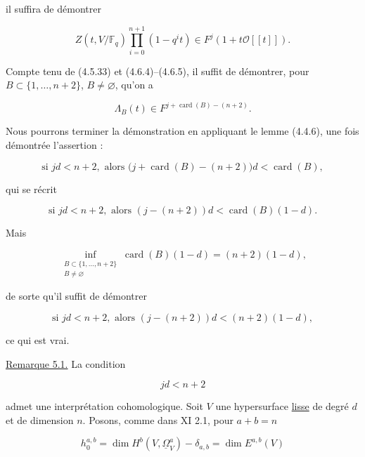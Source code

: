 il suffira de démontrer

\begin{equation}\tag{5.0.11}
Z(t,V/\mathbb F_q)\prod_{i=0}^{n+1}(1-q^it)
\in F^j(1+t\mathcal O[[t]]).
\end{equation}

Compte tenu de (4.5.33) et (4.6.4)--(4.6.5), il suffit de démontrer, pour
$B\subset\{1,\ldots,n+2\}$, $B\ne\varnothing$, qu'on a

\begin{equation}\tag{5.0.12}
\Lambda_B(t)\in F^{j+\operatorname{card}(B)-(n+2)}.
\end{equation}

Nous pourrons terminer la démonstration en appliquant le lemme (4.4.6), une
fois démontrée l'assertion :

\begin{equation}\tag{5.0.13}
\text{si }jd<n+2,\text{ alors }
\bigl(j+\operatorname{card}(B)-(n+2)\bigr)d
<\operatorname{card}(B),
\end{equation}

qui se récrit


\begin{equation}\tag{5.0.14}
\text{si }jd<n+2,\text{ alors }
(j-(n+2))d<\operatorname{card}(B)(1-d).
\end{equation}

Mais

\[
\inf_{\substack{B\subset\{1,\ldots,n+2\}\\B\ne\varnothing}}
\operatorname{card}(B)(1-d)
=(n+2)(1-d),
\]

de sorte qu'il suffit de démontrer

\begin{equation}\tag{5.0.15}
\text{si }jd<n+2,\text{ alors }
(j-(n+2))d<(n+2)(1-d),
\end{equation}

ce qui est vrai.

\underline{Remarque 5.1.}
La condition

\begin{equation}\tag{5.1.1}
jd<n+2
\end{equation}

admet une interprétation cohomologique. Soit $V$ une hypersurface \underline{lisse} de
degré $d$ et de dimension $n$. Posons, comme dans XI 2.1, pour $a+b=n$

\begin{equation}\tag{5.1.2}
h_0^{a,b}
=\dim H^b(V,\underline{\Omega}_V^a)-\delta_{a,b}
=\dim E^{a,b}(V)
\end{equation}

